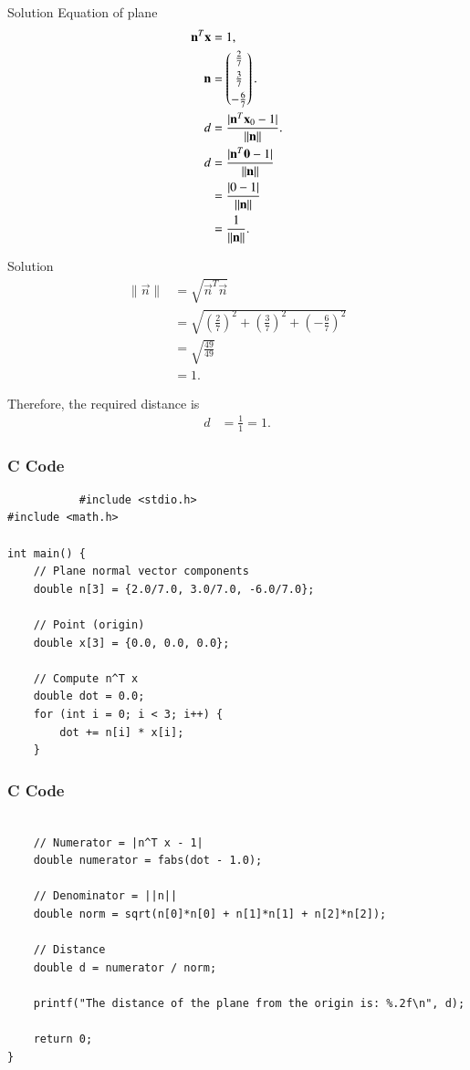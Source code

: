 \documentclass{beamer}
\begin{document}
\begin{frame}{Solution}
    Equation of plane
\begin{align}
    \mathbf{n}^T \mathbf{x} &= 1,\\
    \mathbf{n} &= \begin{pmatrix}\tfrac{2}{7}\\[4pt]\tfrac{3}{7}\\[4pt]-\tfrac{6}{7}\end{pmatrix}.\\
    d &= \frac{|\mathbf{n}^T \mathbf{x}_0 - 1|}{\|\mathbf{n}\|}.\\
    d &= \frac{|\mathbf{n}^T \mathbf{0} - 1|}{\|\mathbf{n}\|} \\
      &= \frac{|0 - 1|}{\|\mathbf{n}\|} \\
      &= \frac{1}{\|\mathbf{n}\|}.\\
      \end{align}
      \end{frame}
      \begin{frame}{Solution}
      \begin{align}
    \|\vec{n}\| &= \sqrt{\vec{n}^T \vec{n}} \\
    &= \sqrt{\left(\tfrac{2}{7}\right)^2 + \left(\tfrac{3}{7}\right)^2 + \left(-\tfrac{6}{7}\right)^2} \\
    &= \sqrt{\tfrac{49}{49}} \\
    &= 1.
\end{align}

Therefore, the required distance is
\begin{align}
    d &= \frac{1}{1} = \boxed{1}.
\end{align}

\end{frame}
\begin{frame}[fragile]
       \frametitle{C Code}
       \begin{lstlisting}
           #include <stdio.h>
#include <math.h>

int main() {
    // Plane normal vector components
    double n[3] = {2.0/7.0, 3.0/7.0, -6.0/7.0};

    // Point (origin)
    double x[3] = {0.0, 0.0, 0.0};

    // Compute n^T x
    double dot = 0.0;
    for (int i = 0; i < 3; i++) {
        dot += n[i] * x[i];
    }
\end{lstlisting}
\end{frame}
\begin{frame}[fragile]
       \frametitle{C Code}
       \begin{lstlisting}

    // Numerator = |n^T x - 1|
    double numerator = fabs(dot - 1.0);

    // Denominator = ||n||
    double norm = sqrt(n[0]*n[0] + n[1]*n[1] + n[2]*n[2]);

    // Distance
    double d = numerator / norm;

    printf("The distance of the plane from the origin is: %.2f\n", d);

    return 0;
}
 \end{lstlisting}
\end{frame}
\end{document}
